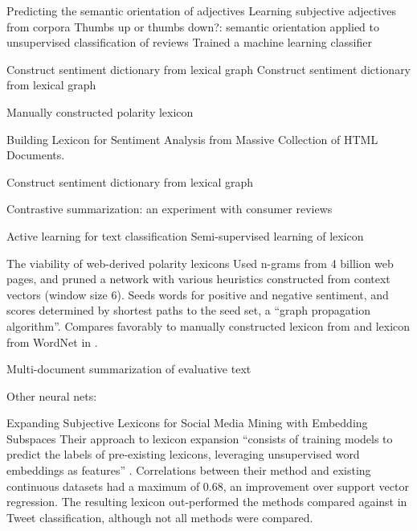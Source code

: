 Predicting the semantic orientation of adjectives \cite{hatzivassiloglou1997predicting}
Learning subjective adjectives from corpora \cite{wiebe2000learning}
Thumbs up or thumbs down?: semantic orientation applied to unsupervised classification of reviews \cite{turney2002thumbs}
Trained a machine learning classifier \cite{pang2002thumbs}

\cite{turney2003measuring}
\cite{taboada2004analyzing}

Construct sentiment dictionary from lexical graph \cite{kim2004determining}
Construct sentiment dictionary from lexical graph \cite{hu2004mining}

Manually constructed polarity lexicon \cite{das2007yahoo}

Building Lexicon for Sentiment Analysis from Massive Collection of HTML Documents. \cite{kaji2007building}

Construct sentiment dictionary from lexical graph \cite{blair2008building}

\cite{bestgen2008building}

Contrastive summarization: an experiment with consumer reviews\cite{lerman2009contrastive}

Active learning for text classification \cite{esuli2009active}
Semi-supervised learning of lexicon \cite{rao2009semi}

\cite{velikovich2010viability}
The viability of web-derived polarity lexicons
Used n-grams from 4 billion web pages, and pruned a network with various heuristics constructed from context vectors (window size 6).
Seeds words for positive and negative sentiment, and scores determined by shortest paths to the seed set, a ``graph propagation algorithm''.
Compares favorably to manually constructed lexicon from \cite{wilson2005recognizing} and lexicon from WordNet in \cite{blair2008building}.

\cite{bestgen2012checking}

\cite{carenini2013multi}
Multi-document summarization of evaluative text

\cite{tang2014building}

Other neural nets:
\cite{kim2014convolutional}

\cite{recchia2015reproducing}

\cite{amir2016expanding}
Expanding Subjective Lexicons for Social Media Mining with Embedding Subspaces
Their approach to lexicon expansion ``consists of training models to predict the labels of pre-existing lexicons, leveraging unsupervised word embeddings as features'' \cite{amir2016expanding}.
Correlations between their method and existing continuous datasets had a maximum of 0.68, an improvement over support vector regression.
The resulting lexicon out-performed the methods compared against in Tweet classification, although not all methods were compared.

